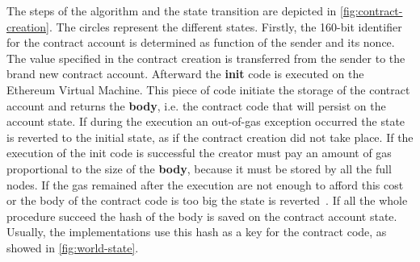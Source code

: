 The steps of the algorithm and the state transition are depicted in
\autoref{fig:contract-creation}. The circles represent the different states.
Firstly, the 160-bit identifier for the contract account is determined as
function of the sender and its nonce. The value specified in the contract
creation is transferred from the sender to the brand new contract account.
Afterward the \textbf{init} code is executed on the Ethereum Virtual Machine.
This  piece of code initiate the storage of the contract account and returns the
\textbf{body}, i.e. the contract code that will persist on the account state.
If during the execution an out-of-gas exception occurred the state is reverted
to the initial state, as if the contract creation did not take place.
If the execution of the init code is successful the creator must pay an amount
of gas proportional to the size of the \textbf{body}, because it must be
stored by all the full nodes. If the gas remained after the execution are not
enough to afford this cost or the body of the contract code is too big the
state is reverted~\cite{wood2018ethereum}.
If all the whole procedure succeed the hash of the body is saved on the
contract account state. Usually, the implementations use this hash as a key for
the contract code, as showed in \autoref{fig:world-state}.
 
